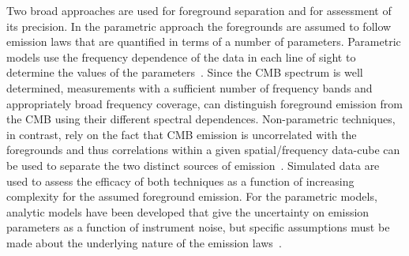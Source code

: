 \documentclass[PICOReport.tex]{subfiles}
\begin{document}
Two broad approaches are used for foreground separation and for assessment of its precision.  In the parametric approach the foregrounds are assumed to follow emission laws that are quantified in terms of a number of parameters. Parametric
models use the frequency dependence of the data in each line of sight to determine the values of the parameters~\citep{parametric}.  Since the CMB spectrum is well determined, measurements with a sufficient number of frequency bands and appropriately broad frequency coverage, can distinguish foreground emission from the CMB using their different spectral dependences. Non-parametric techniques, in contrast, rely on the fact that CMB emission is uncorrelated with the foregrounds and thus correlations within a given spatial/frequency data-cube can be used to separate the two distinct sources of emission~\citep{nonparametric}.  Simulated data are used to assess the efficacy of both techniques as a function of increasing complexity for the assumed foreground emission. For the parametric models, analytic models have been developed that give the uncertainty on emission parameters as a function of instrument noise, but specific assumptions must be made about the underlying nature of the emission laws~\citep{fisher}. 

\end{document}
